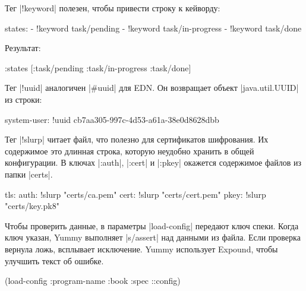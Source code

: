 \noindent
Тег \spverb|!keyword| полезен, чтобы привести строку к кейворду:

\begin{english}
  \begin{yaml}
states:
  - !keyword task/pending
  - !keyword task/in-progress
  - !keyword task/done
  \end{yaml}
\end{english}

\noindent
Результат:

\begin{english}
  \begin{clojure}
{:states [:task/pending :task/in-progress :task/done]}
  \end{clojure}
\end{english}

Тег \spverb|!uuid| аналогичен \spverb|#uuid| для EDN. Он возвращает объект
\spverb|java.util.UUID| из строки:

\begin{english}
  \begin{yaml}
system-user: !uuid cb7aa305-997c-4d53-a61a-38e0d8628dbb
  \end{yaml}
\end{english}

Тег \spverb|!slurp| читает файл, что полезно для сертификатов шифрования. Их
содержимое это длинная строка, которую неудобно хранить в общей конфигурации. В
ключах \spverb|:auth|, \spverb|:cert| и \spverb|:pkey| окажется содержимое
файлов из папки \spverb|certs|.

\begin{english}
  \begin{yaml}
tls:
  auth: !slurp "certs/ca.pem"
  cert: !slurp "certs/cert.pem"
  pkey: !slurp "certs/key.pk8"
  \end{yaml}
\end{english}


Чтобы проверить данные, в параметры \spverb|load-config| передают ключ
спеки. Когда ключ указан, Yummy выполняет \spverb|s/assert| над данными из
файла. Если проверка вернула ложь, всплывает исключение. Yummy использует
Expound, чтобы улучшить текст об ошибке.

\begin{english}
  \begin{clojure}
(load-config {:program-name :book
              :spec ::config})
  \end{clojure}
\end{english}

